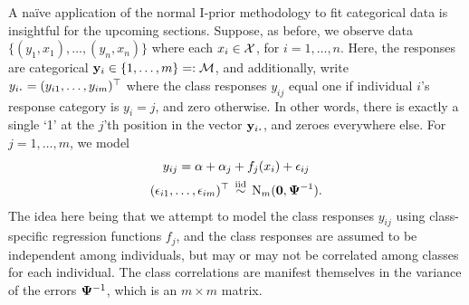A naïve application of the normal I-prior methodology to fit  categorical data is insightful for the upcoming sections.
Suppose, as before, we observe data $\{(y_1,x_1),\dots,(y_n,x_n) \}$ where each $x_i \in {\mathcal X}$, for $i=1,\dots,n$.
Here, the responses are categorical ${\mathbf y}_i \in \{ 1,\dots,m \} =: 
{\mathcal M} $, and additionally, write $y_{i \bigcdot} = (y_{i1},\dots,y_{im})^\top$ where the class responses $y_{ij}$ equal one if individual $i$'s response category is $y_i = j$, and zero otherwise.
In other words, there is exactly a single `1' at the $j$'th position in the vector $\by_{i \bigcdot}$, and zeroes everywhere else.
For $j=1,\dots,m$, we model 
\begin{equation}\label{eq:naiveclassmod}
  \begin{gathered}
    y_{ij} = \alpha + \alpha_j + f_j(x_i) + \epsilon_{ij}  \\
    (\epsilon_{i1},\dots,\epsilon_{im})^\top \,\overset{\text{iid}}{\sim}\, \operatorname{N}_m({\mathbf 0},{\bm\Psi}^{-1}).
  \end{gathered}
\end{equation}
The idea here being that we attempt to model the class responses $y_{ij}$ using class-specific regression functions $f_j$, and the class responses are assumed to be independent among individuals, but may or may not be correlated among classes for each individual.
The class correlations are manifest themselves in the variance of the errors ${\bm\Psi}^{-1}$, which is an $m\times m$ matrix.

